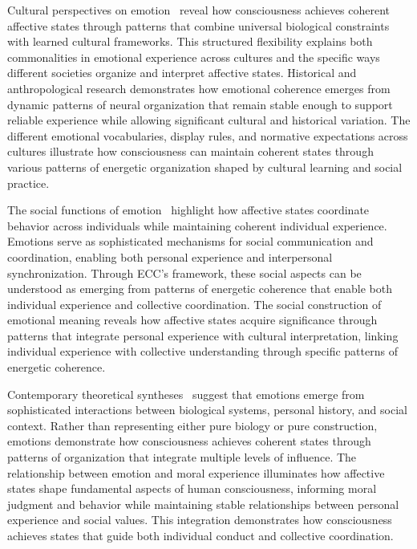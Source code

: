 Cultural perspectives on emotion~\cite{Lutz1988, van2025processes, Rosaldo1980, da2024mathematical, Reddy2001, amil2024theta} reveal how consciousness achieves coherent affective states through patterns that combine universal biological constraints with learned cultural frameworks. This structured flexibility explains both commonalities in emotional experience across cultures and the specific ways different societies organize and interpret affective states. Historical and anthropological research demonstrates how emotional coherence emerges from dynamic patterns of neural organization that remain stable enough to support reliable experience while allowing significant cultural and historical variation. The different emotional vocabularies, display rules, and normative expectations across cultures illustrate how consciousness can maintain coherent states through various patterns of energetic organization shaped by cultural learning and social practice.

The social functions of emotion~\cite{Keltner2001, hunt2024electromagnetic, Scherer2014, bosl2025dynamical, White1994, pinotsis2023cytoelectric} highlight how affective states coordinate behavior across individuals while maintaining coherent individual experience. Emotions serve as sophisticated mechanisms for social communication and coordination, enabling both personal experience and interpersonal synchronization. Through ECC's framework, these social aspects can be understood as emerging from patterns of energetic coherence that enable both individual experience and collective coordination. The social construction of emotional meaning reveals how affective states acquire significance through patterns that integrate personal experience with cultural interpretation, linking individual experience with collective understanding through specific patterns of energetic coherence.

Contemporary theoretical syntheses~\cite{Wentworth1992, butlin2023consciousnessartificialintelligenceinsights, LeDoux2015, kukushkin2024massed} suggest that emotions emerge from sophisticated interactions between biological systems, personal history, and social context. Rather than representing either pure biology or pure construction, emotions demonstrate how consciousness achieves coherent states through patterns of organization that integrate multiple levels of influence. The relationship between emotion and moral experience illuminates how affective states shape fundamental aspects of human consciousness, informing moral judgment and behavior while maintaining stable relationships between personal experience and social values. This integration demonstrates how consciousness achieves states that guide both individual conduct and collective coordination.

